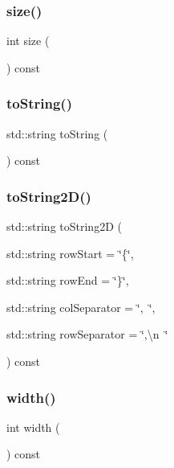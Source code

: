 \subsubsection{\texorpdfstring{size()}{size()}}
{\footnotesize\ttfamily int size (\begin{DoxyParamCaption}{ }\end{DoxyParamCaption}) const}

\mbox{\label{classGrid_a1fe5121d6528fdea3f243321b3fa3a49}} 
\subsubsection{\texorpdfstring{to\+String()}{toString()}}
{\footnotesize\ttfamily std\+::string to\+String (\begin{DoxyParamCaption}{ }\end{DoxyParamCaption}) const}

\mbox{\label{classGrid_a8e636ad8b56218c7e0162d6c1bd78b39}} 
\subsubsection{\texorpdfstring{to\+String2\+D()}{toString2D()}}
{\footnotesize\ttfamily std\+::string to\+String2D (\begin{DoxyParamCaption}\item[{std\+::string}]{row\+Start = {\ttfamily \char`\"{}\{\char`\"{}},  }\item[{std\+::string}]{row\+End = {\ttfamily \char`\"{}\}\char`\"{}},  }\item[{std\+::string}]{col\+Separator = {\ttfamily \char`\"{},~\char`\"{}},  }\item[{std\+::string}]{row\+Separator = {\ttfamily \char`\"{},\textbackslash{}n~\char`\"{}} }\end{DoxyParamCaption}) const}

\mbox{\label{classGrid_ad72663daf610f2a0833a2fc3d78e4fdf}} 
\subsubsection{\texorpdfstring{width()}{width()}}
{\footnotesize\ttfamily int width (\begin{DoxyParamCaption}{ }\end{DoxyParamCaption}) const}



